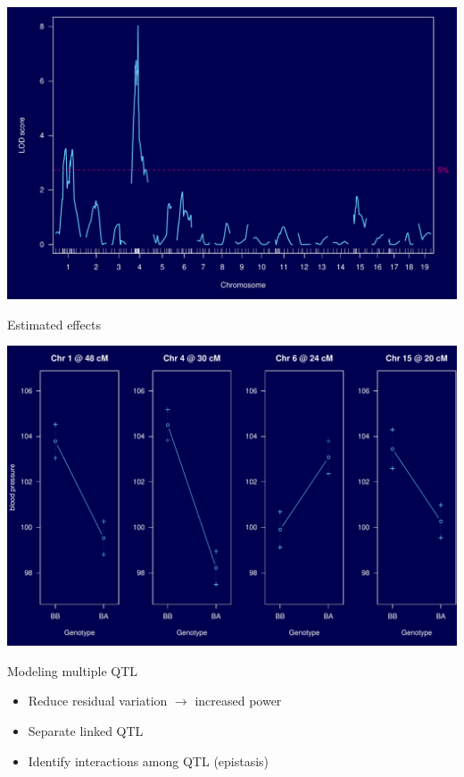 \documentclass[12pt]{article}
\newcommand{\headsize}{\fontsize{35}{35} \selectfont}
\newcommand{\smallsize}{\fontsize{25}{30} \selectfont}
\begin{document}
\centerline{\includegraphics{FigsB/alod2.pdf}}

\newpage

\headsize \color{myyellow}
\hfill \begin{minipage}{5.75in}
\centering
Estimated effects
\end{minipage}

\vfill

\centerline{\includegraphics{FigsB/meffects.pdf}}

\newpage

\headsize \color{myyellow}
\hfill \begin{minipage}{5.75in}
\centering
Modeling multiple QTL
\end{minipage}

\vspace{3cm}

\color{mywhite} \smallsize

\hfill \begin{minipage}[t]{10in}
\begin{itemize}
\itemsep24pt
\item Reduce residual variation $\longrightarrow$ increased power

\item Separate linked QTL

\item Identify interactions among QTL {\color{myblue} (epistasis)}

\end{itemize}
\end{minipage}
\end{document}
